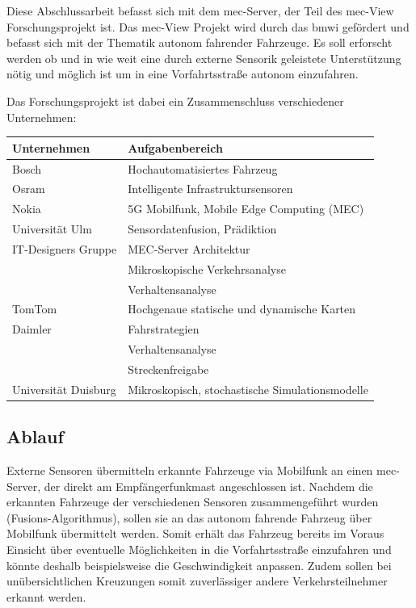 Diese Abschlussarbeit befasst sich mit dem \gls{mec}-Server, der Teil des \gls{mec}-View Forschungsprojekt ist.
Das \gls{mec}-View Projekt wird durch das \gls{bmwi} gefördert und befasst sich mit der Thematik autonom fahrender Fahrzeuge.
Es soll erforscht werden ob und in wie weit eine durch externe Sensorik geleistete Unterstützung nötig und möglich ist um in eine Vorfahrtsstraße autonom einzufahren.

Das Forschungsprojekt ist dabei ein Zusammenschluss verschiedener Unternehmen:
\begin{center}
	\begin{tabular}{l|l}		
		Unternehmen & Aufgabenbereich \\ \hline \hline
		Bosch & Hochautomatisiertes Fahrzeug \\
		Osram & \glqq{}Intelligente\grqq{} Infrastruktursensoren \\ 
		Nokia & 5G Mobilfunk, Mobile Edge Computing (MEC) \\
		Universität Ulm & Sensordatenfusion, Prädiktion \\
		\rowcolor{lightgray!20} IT-Designers Gruppe & MEC-Server Architektur\\
		\rowcolor{lightgray!20} & Mikroskopische Verkehrsanalyse \\
		\rowcolor{lightgray!20} & Verhaltensanalyse \\
		TomTom & Hochgenaue statische und dynamische Karten \\
		Daimler & Fahrstrategien \\
		& Verhaltensanalyse \\
		& Streckenfreigabe \\
		Universität Duisburg & Mikroskopisch, stochastische Simulationsmodelle
	\end{tabular}
\end{center}


\subsection{Ablauf}
Externe Sensoren übermitteln erkannte Fahrzeuge via Mobilfunk an einen \gls{mec}-Server, der direkt am Empfängerfunkmast angeschlossen ist. 
Nachdem die erkannten Fahrzeuge der verschiedenen Sensoren zusammengeführt wurden (Fusions-Algorithmus), sollen sie an das autonom fahrende Fahrzeug über Mobilfunk übermittelt werden.
Somit erhält das Fahrzeug bereits im Voraus Einsicht über eventuelle Möglichkeiten in die Vorfahrtsstraße einzufahren und könnte deshalb beispielsweise die Geschwindigkeit anpassen.
Zudem sollen bei unübersichtlichen Kreuzungen somit zuverlässiger andere Verkehrsteilnehmer erkannt werden.

